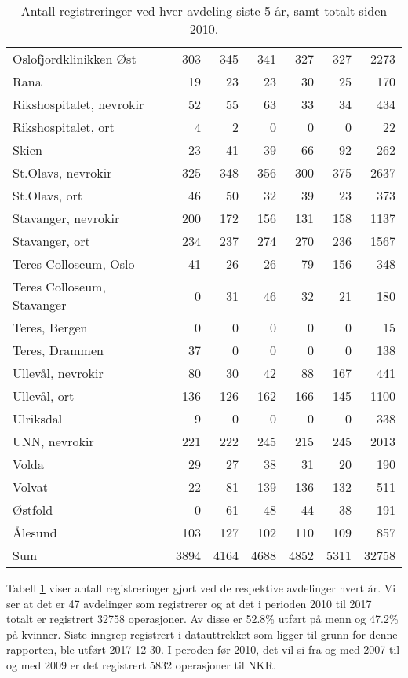 \documentclass [norsk,a4paper,twoside]{article}\usepackage[]{graphicx}\usepackage[]{color}
\begin{document}
\begin{table}[ht]
\begin{tabular}{lrrrrrr}
  Oslofjordklinikken Øst & 303 & 345 & 341 & 327 & 327 & 2273 \\ 
  Rana & 19 & 23 & 23 & 30 & 25 & 170 \\ 
  Rikshospitalet, nevrokir & 52 & 55 & 63 & 33 & 34 & 434 \\ 
  Rikshospitalet, ort & 4 & 2 & 0 & 0 & 0 & 22 \\ 
  Skien & 23 & 41 & 39 & 66 & 92 & 262 \\ 
  St.Olavs, nevrokir & 325 & 348 & 356 & 300 & 375 & 2637 \\ 
  St.Olavs, ort & 46 & 50 & 32 & 39 & 23 & 373 \\ 
  Stavanger, nevrokir & 200 & 172 & 156 & 131 & 158 & 1137 \\ 
  Stavanger, ort & 234 & 237 & 274 & 270 & 236 & 1567 \\ 
  Teres Colloseum, Oslo & 41 & 26 & 26 & 79 & 156 & 348 \\ 
  Teres Colloseum, Stavanger & 0 & 31 & 46 & 32 & 21 & 180 \\ 
  Teres, Bergen & 0 & 0 & 0 & 0 & 0 & 15 \\ 
  Teres, Drammen & 37 & 0 & 0 & 0 & 0 & 138 \\ 
  Ullevål, nevrokir & 80 & 30 & 42 & 88 & 167 & 441 \\ 
  Ullevål, ort & 136 & 126 & 162 & 166 & 145 & 1100 \\ 
  Ulriksdal & 9 & 0 & 0 & 0 & 0 & 338 \\ 
  UNN, nevrokir & 221 & 222 & 245 & 215 & 245 & 2013 \\ 
  Volda & 29 & 27 & 38 & 31 & 20 & 190 \\ 
  Volvat & 22 & 81 & 139 & 136 & 132 & 511 \\ 
  Østfold & 0 & 61 & 48 & 44 & 38 & 191 \\ 
  Ålesund & 103 & 127 & 102 & 110 & 109 & 857 \\ 
  Sum & 3894 & 4164 & 4688 & 4852 & 5311 & 32758 \\ 
   \hline
\end{tabular}
\caption{Antall registreringer ved hver avdeling siste 5 år, samt totalt siden 2010.} 
\label{tab:AntReg}
\end{table}


Tabell \ref{tab:AntReg} viser antall 
registreringer gjort ved de respektive avdelinger hvert år. Vi ser at det er  
47 avdelinger som registrerer og at det i perioden 2010 til 2017 totalt er registrert 32758 
operasjoner. Av disse er 52.8\% utført på menn og 47.2\% på kvinner.
Siste inngrep registrert i datauttrekket som ligger til grunn for denne rapporten, ble utført 
2017-12-30. I peroden før 2010, det vil si fra og med 2007 til og med 2009 er det 
registrert 5832 operasjoner til NKR. 
\end{document}
